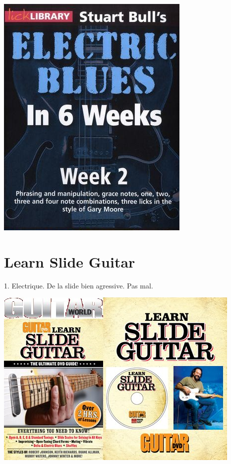 \documentclass[a4paper]{book}
\begin{document}
\begin{center}
\includegraphics[width=9.366cm,height=12.039cm]{lebluessupportsmethodes-img126.jpg}
\end{center}




\clearpage\section[Learn Slide Guitar]{Learn Slide Guitar}
\hypertarget{RefHeadingToc178973218262}{}1. Electrique. De la slide bien
agressive. Pas mal.






\begin{center}
\includegraphics[width=11.906cm,height=8.652cm]{lebluessupportsmethodes-img127.jpg}
\end{center}
\end{document}
